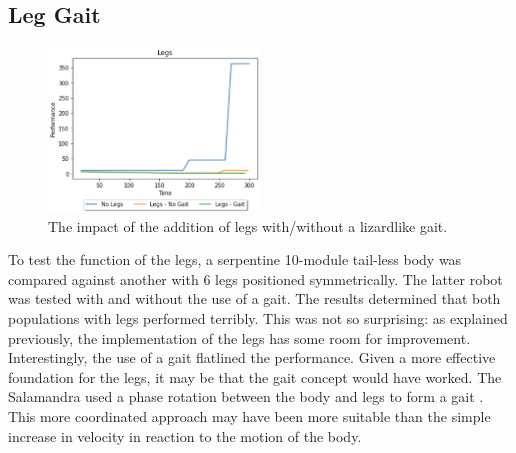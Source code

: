 \documentclass{article}
\begin{document}
\subsection{Leg Gait}
\label{sec:Leg Res}
\begin{figure}
    \centering
    \includegraphics[width=0.5\textwidth]{legResults}
    \caption{The impact of the addition of legs with/without a lizardlike gait.}
\end{figure}
To test the function of the legs, a serpentine 10-module tail-less body was compared against another with 6 legs positioned symmetrically. The latter robot was tested with and without the use of a gait. The results determined that both populations with legs performed terribly. This was not so surprising: as explained previously, the implementation of the legs has some room for improvement.\\
Interestingly, the use of a gait flatlined the performance. Given a more effective foundation for the legs, it may be that the gait concept would have worked. The Salamandra used a phase rotation between the body and legs to form a gait . This more coordinated approach may have been more suitable than the simple increase in velocity in reaction to the motion of the body. \\
\end{document}
